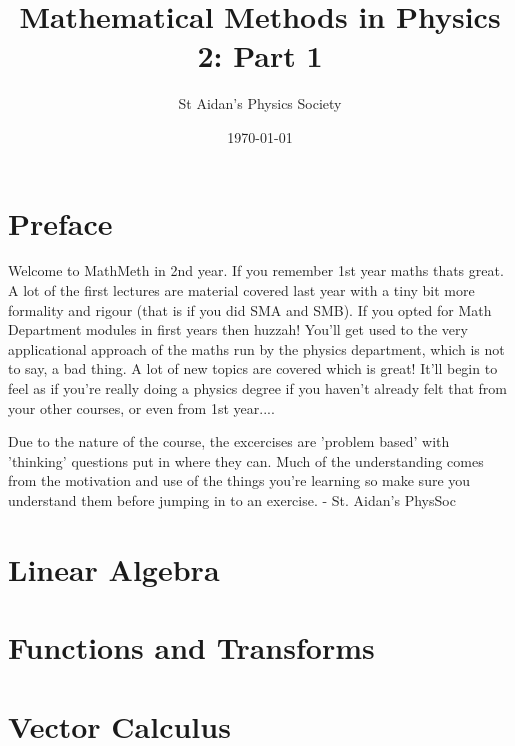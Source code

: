 \documentclass{physics_notes}
\title{Mathematical Methods in Physics 2: Part 1}
\author{St Aidan's Physics Society}
\date{\today}
\begin{document}
\maketitle


\tableofcontents
\newpage

\section{Preface}
Welcome to MathMeth in 2nd year. If you remember 1st year maths thats great. A lot of the first lectures are material covered last year with a tiny bit more formality and rigour (that is if you did SMA and SMB). If you opted for Math Department modules in first years then huzzah! You'll get used to the very applicational approach of the maths run by the physics department, which is not to say, a bad thing. A lot of new topics are covered which is great! It'll begin to feel as if you're really doing a physics degree if you haven't already felt that from your other courses, or even from 1st year....

Due to the nature of the course, the excercises are 'problem based' with 'thinking' questions put in where they can. Much of the understanding comes from the motivation and use of the things you're learning so make sure you understand them before jumping in to an exercise. - St. Aidan's PhysSoc

\section{Linear Algebra}



\section{Functions and Transforms}


\section{Vector Calculus}

\end{document}

